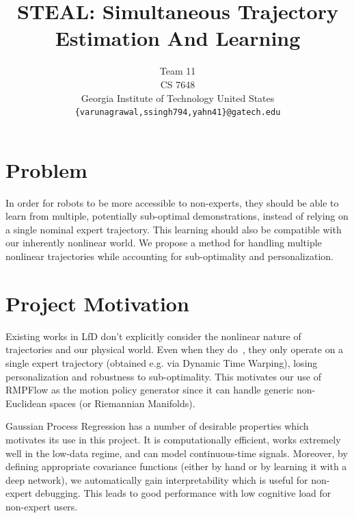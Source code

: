 \documentclass{article}
\title{STEAL: Simultaneous Trajectory Estimation And Learning \vspace{-1.5em}}
\author{
  Team 11\\
  CS 7648\\
  Georgia Institute of Technology
  United States\\
  \texttt{\{varunagrawal,ssingh794,yahn41\}@gatech.edu} \\
}
\begin{document}
\maketitle

\vspace{-3.5em}
\section{Problem}


In order for robots to be more accessible to non-experts, they should be able to learn from multiple, potentially sub-optimal demonstrations, instead of relying on a single nominal expert trajectory. This learning should also be compatible with our inherently nonlinear world.  We propose a method for handling multiple nonlinear trajectories while accounting for sub-optimality and personalization.

\vspace{-1em}
\section{Project Motivation}

Existing works in LfD don't explicitly consider the nonlinear nature of trajectories and our physical world. Even when they do~\cite{Rana20corl}, they only operate on a single expert trajectory (obtained e.g. via Dynamic Time Warping), losing personalization and robustness to sub-optimality.
This motivates our use of RMPFlow as the motion policy generator since it can handle generic non-Euclidean spaces (or Riemannian Manifolds).


Gaussian Process Regression has a number of desirable properties which motivates its use in this project. It is computationally efficient, works extremely well in the low-data regime, and can model continuous-time signals. Moreover, by defining appropriate covariance functions (either by hand or by learning it with a deep network), we automatically gain interpretability which is useful for non-expert debugging. This leads to good performance with low cognitive load for non-expert users.
\end{document}
